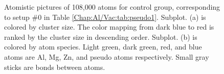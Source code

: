 \newpage
\begingroup
\begin{figure}[!ht]
  \centering
\caption[Atomistic pictures of 108,000 atoms for the control group of the sensitivity test.]{Atomistic pictures of 108,000 atoms for control group, corresponding to setup \#0 in Table \ref{Chap:Al/Vac:tab:pseudo1}. Subplot. (a) is colored by cluster size. The color mapping from dark blue to red is ranked by the cluster size in descending order. Subplot. (b) is colored by atom species. Light green, dark green, red, and blue atoms are Al, Mg, Zn, and pseudo atoms respectively. Small gray sticks are bonds between atoms.}
\label{Chap:Al/Vac:fig:sens_control}
\end{figure}
\endgroup

